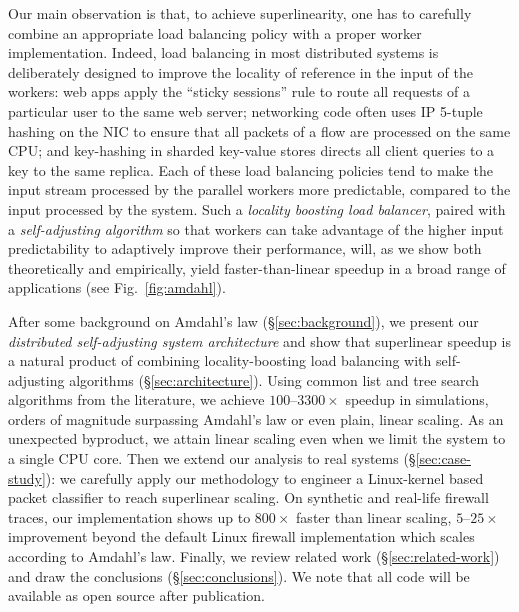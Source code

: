 Our main observation is that, to achieve superlinearity, one has to carefully combine an appropriate load balancing policy with a proper worker implementation. Indeed, load balancing in most distributed systems is deliberately designed to improve the locality of reference in the input of the workers: web apps apply the ``sticky sessions'' rule to route all requests of a particular user to the same web server; %
networking code often uses IP 5-tuple hashing on the NIC to ensure that all packets of a flow are processed on the same CPU; %
and key-hashing in sharded key-value stores directs all client queries to a key to the same replica. Each of these load balancing policies tend to make the input stream processed by the parallel workers more predictable, compared to the input processed by the system. Such a \emph{locality boosting load balancer}, paired with a \emph{self-adjusting algorithm} so that workers can take advantage of the higher input predictability to adaptively improve their performance, will, as we show both theoretically and empirically, yield faster-than-linear speedup in a broad range of applications (see Fig.~\ref{fig:amdahl}). %

After some background on Amdahl's law (\S\ref{sec:background}), we present our \emph{distributed self-adjusting system architecture} and show that superlinear speedup is a natural product of combining locality-boosting load balancing with self-adjusting algorithms (\S\ref{sec:architecture}). Using common list and tree search algorithms from the literature, we achieve $100$--$3300\times$ speedup in simulations, orders of magnitude surpassing Amdahl's law or even plain, linear scaling. As an unexpected byproduct, we attain linear scaling even when we limit the system to a single CPU core. Then we extend our analysis to real systems (\S\ref{sec:case-study}): we carefully apply our methodology to engineer a Linux-kernel based packet classifier to reach superlinear scaling. On synthetic and real-life firewall traces, our implementation shows up to $800\times$ faster than linear scaling, $5$--$25\times$ improvement beyond the default Linux firewall implementation which scales according to Amdahl's law. Finally, we review related work (\S\ref{sec:related-work}) and draw the conclusions (\S\ref{sec:conclusions}). We note that all code will be available as open source after publication.


